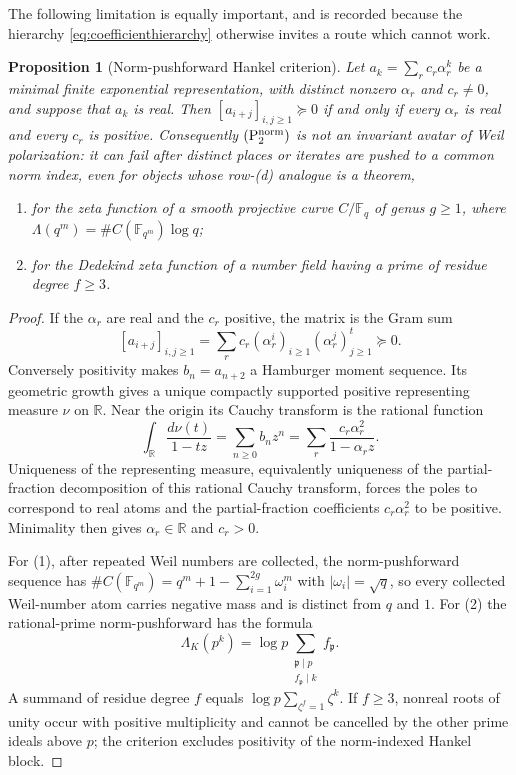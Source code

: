 \documentclass[11pt]{amsart}
\newtheorem{proposition}[theorem]{Proposition}
\theoremstyle{definition}
\theoremstyle{remark}
\newcommand{\R}{\mathbb R}
\begin{document}
The following limitation is equally important, and is recorded because the
hierarchy \eqref{eq:coefficienthierarchy} otherwise invites a route which
cannot work.

\begin{proposition}[Norm-pushforward Hankel criterion]
\label{prop:P2nogo}
Let $a_k=\sum_rc_r\alpha_r^k$ be a minimal finite exponential
representation, with distinct nonzero $\alpha_r$ and $c_r\ne0$, and suppose
that $a_k$ is real.  Then $[a_{i+j}]_{i,j\ge1}\succeq0$ if and only if every
$\alpha_r$ is real and every $c_r$ is positive.  Consequently
$\mathrm{(P_2^{\rm norm})}$ is not an invariant avatar of Weil
polarization: it can fail after distinct places or iterates are pushed to a
common norm index, even for objects whose row-(d) analogue is a theorem,
\begin{enumerate}
\item for the zeta function of a smooth projective curve $C/\mathbb F_q$ of
genus $g\ge1$, where $\Lambda(q^m)=\#C(\mathbb F_{q^m})\log q$;
\item for the Dedekind zeta function of a number field having a prime of
residue degree $f\ge3$.
\end{enumerate}
\end{proposition}

\begin{proof}
If the $\alpha_r$ are real and the $c_r$ positive, the matrix is the Gram
sum
\[
 [a_{i+j}]_{i,j\ge1}
 =\sum_r c_r(\alpha_r^i)_{i\ge1}(\alpha_r^j)_{j\ge1}^{t}\succeq0.
\]
Conversely positivity makes $b_n=a_{n+2}$ a Hamburger moment sequence.
Its geometric growth gives a unique compactly supported positive
representing measure $\nu$ on $\R$.  Near the origin its Cauchy transform is
the rational function
\[
 \int_\R\frac{d\nu(t)}{1-tz}
 =\sum_{n\ge0}b_nz^n
 =\sum_r\frac{c_r\alpha_r^2}{1-\alpha_rz}.
\]
Uniqueness of the representing measure, equivalently uniqueness of the
partial-fraction decomposition of this rational Cauchy transform, forces the
poles to correspond to real atoms and the partial-fraction coefficients
$c_r\alpha_r^2$ to be positive.  Minimality then gives
$\alpha_r\in\R$ and $c_r>0$.

For (1), after repeated Weil numbers are collected, the norm-pushforward
sequence has
$\#C(\mathbb F_{q^m})=q^m+1-\sum_{i=1}^{2g}\omega_i^m$ with
$|\omega_i|=\sqrt q$, so every collected Weil-number atom carries negative
mass and is distinct from $q$ and $1$.  For (2) the rational-prime
norm-pushforward has the formula
\[
 \Lambda_K(p^k)=\log p
 \sum_{\substack{\mathfrak p\mid p\\ f_{\mathfrak p}\mid k}}
 f_{\mathfrak p}.
\]
A summand of residue degree $f$ equals
$\log p\sum_{\zeta^f=1}\zeta^k$.  If $f\ge3$, nonreal roots of unity occur
with positive multiplicity and cannot be cancelled by the other prime ideals
above $p$; the criterion excludes positivity of the norm-indexed Hankel
block.
\end{proof}
\end{document}
